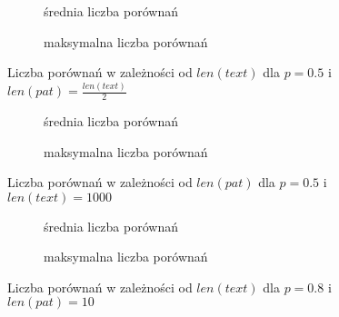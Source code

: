 \begin{figure}[htb]
    \centering
    \begin{subfigure}[b]{0.49\textwidth}
        \centering
        
        \caption{średnia liczba porównań}
        \label{fig:result_alph_geo_05_pat_len(text)2_plot_avg_100}
    \end{subfigure}
    \hfill
    \begin{subfigure}[b]{0.49\textwidth}
        \centering
        
        \caption{maksymalna liczba porównań}
        \label{fig:result_alph_geo_05_pat_len(text)2_plot_max_100}
    \end{subfigure}
    \hfill
    \caption{Liczba porównań w zależności od $len(text)$ dla $p = 0.5$ i $len(pat) = \frac{len(text)}{2}$}
    \label{fig:result_alph_geo_05_pat_len(text)2}
\end{figure}

\begin{figure}[htb]
    \centering
    \begin{subfigure}[b]{0.49\textwidth}
        \centering
        
        \caption{średnia liczba porównań}
        \label{fig:result_alph_geo_05_text_1000_plot_avg_100}
    \end{subfigure}
    \hfill
    \begin{subfigure}[b]{0.49\textwidth}
        \centering
        
        \caption{maksymalna liczba porównań}
        \label{fig:result_alph_geo_05_text_1000_plot_max_100}
    \end{subfigure}
    \hfill
    \caption{Liczba porównań w zależności od $len(pat)$ dla $p = 0.5$ i $len(text) = 1000$}
    \label{fig:result_alph_geo_05_text_1000}
\end{figure}

\begin{figure}[htb]
    \centering
    \begin{subfigure}[b]{0.49\textwidth}
        \centering
        
        \caption{średnia liczba porównań}
        \label{fig:result_alph_geo_08_pat_10_plot_avg_100}
    \end{subfigure}
    \hfill
    \begin{subfigure}[b]{0.49\textwidth}
        \centering
        
        \caption{maksymalna liczba porównań}
        \label{fig:result_alph_geo_08_pat_10_plot_max_100}
    \end{subfigure}
    \hfill
    \caption{Liczba porównań w zależności od $len(text)$ dla $p = 0.8$ i $len(pat) = 10$}
    \label{fig:result_alph_geo_08_pat_10}
\end{figure}


